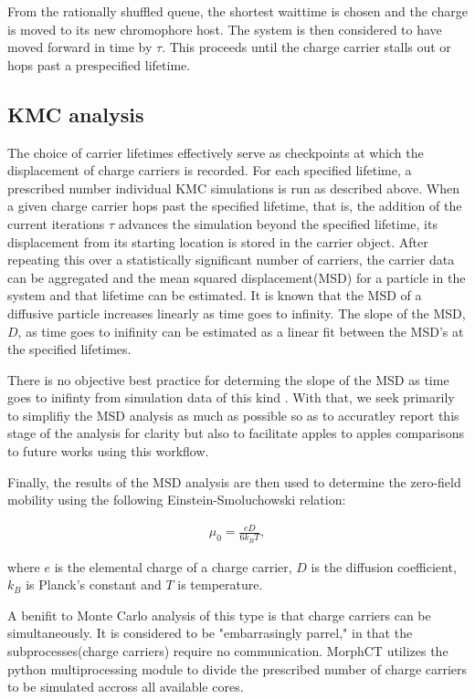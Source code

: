 From the rationally shuffled queue, the shortest waittime is chosen and the charge is moved to
its new chromophore host. The system is then considered to have moved forward in time by $\tau$. This proceeds
until the charge carrier stalls out or hops past a prespecified lifetime. 



\subsection{KMC analysis}

The choice of carrier lifetimes effectively serve as checkpoints at which the displacement of charge carriers is recorded. For
each specified lifetime, a prescribed number individual KMC simulations is run as described above. When a
given charge carrier hops past the specified lifetime, that is, the addition of the current iterations $\tau$ advances
the simulation beyond the specified lifetime,  its displacement from its starting location is stored in the carrier object. After repeating this over a
statistically significant number of carriers, the carrier data can be aggregated and the mean squared
displacement(MSD) for a particle in the system and that lifetime can be estimated.
It is known that the MSD of a diffusive particle increases linearly as time goes to infinity. 
The slope of the MSD, $D$,  as time
goes to inifinity can be estimated as a linear fit between the MSD's at the specified lifetimes.

There is no objective best practice for determing the slope of the MSD as
time goes to inifinty from simulation data of this kind \cite{Maginn2018}. With that, we seek primarily to simplifiy the MSD analysis as much as
possible so as to accuratley report this stage of the analysis for clarity but also to facilitate apples to
apples comparisons to future works using this workflow. 

Finally, the results of the MSD analysis are then used to determine the zero-field mobility using the following Einstein-Smoluchowski relation:

\begin{align}
    \mu_{0} = \frac{eD}{6k_{B}T},
\end{align}

where $e$ is the elemental charge of a charge carrier, $D$ is the diffusion coefficient, $k_{B}$ is Planck's
constant and $T$ is temperature.  

A benifit to Monte Carlo analysis of this type is that charge carriers can be simultaneously. It is considered
to be "embarrasingly parrel," in that the subprocesses(charge carriers) require no communication.
MorphCT utilizes the python multiprocessing module to divide the prescribed number of charge carriers to be
simulated accross all available cores.  

